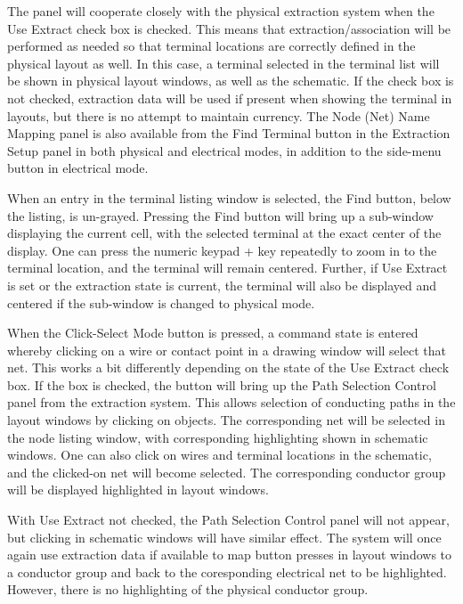 The panel will cooperate closely with the physical extraction system
when the {\cb Use Extract} check box is checked.  This means that
extraction/association will be performed as needed so that terminal
locations are correctly defined in the physical layout as well.  In
this case, a terminal selected in the terminal list will be shown in
physical layout windows, as well as the schematic.  If the check box
is not checked, extraction data will be used if present when showing
the terminal in layouts, but there is no attempt to maintain currency. 
The {\cb Node (Net) Name Mapping} panel is also available from the
{\cb Find Terminal} button in the {\cb Extraction Setup} panel in both
physical and electrical modes, in addition to the side-menu button in
electrical mode.

When an entry in the terminal listing window is selected, the {\cb
Find} button, below the listing, is un-grayed.  Pressing the {\cb
Find} button will bring up a sub-window displaying the current cell,
with the selected terminal at the exact center of the display.  One
can press the numeric keypad {\kb +} key repeatedly to zoom in to the
terminal location, and the terminal will remain centered.  Further, if
{\cb Use Extract} is set or the extraction state is current, the
terminal will also be displayed and centered if the sub-window is
changed to physical mode.

When the {\cb Click-Select Mode} button is pressed, a command state is
entered whereby clicking on a wire or contact point in a drawing
window will select that net.  This works a bit differently depending
on the state of the {\cb Use Extract} check box.  If the box is
checked, the button will bring up the {\cb Path Selection Control}
panel from the extraction system.  This allows selection of conducting
paths in the layout windows by clicking on objects.  The corresponding
net will be selected in the node listing window, with corresponding
highlighting shown in schematic windows.  One can also click on wires
and terminal locations in the schematic, and the clicked-on net will
become selected.  The corresponding conductor group will be displayed
highlighted in layout windows.

With {\cb Use Extract} not checked, the {\cb Path Selection Control}
panel will not appear, but clicking in schematic windows will have
similar effect.  The system will once again use extraction data if
available to map button presses in layout windows to a conductor group
and back to the coresponding electrical net to be highlighted. 
However, there is no highlighting of the physical conductor group.
  
